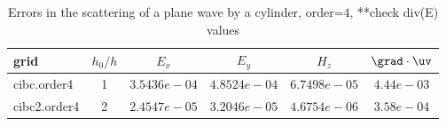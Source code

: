 \begin{table}[hbt]
\begin{center}
\begin{tabular}{|l|c|c|c|c|c|} \hline\hline 
grid  & $h_0/h$ &  $E_x$ &  $E_y$ & $H_z$ & $\grad\cdot\uv$\\ \hline 
cibc.order4  & 1 &  $3.5436e-04$  & $4.8524e-04$ & $6.7498e-05$ & $4.44e-03$   \\ \hline
cibc2.order4 & 2 &  $2.4547e-05$  & $3.2046e-05$ & $4.6754e-06$ & $3.58e-04$   \\ \hline
\end{tabular}
\caption{Errors in the scattering of a plane wave by a cylinder, order=$4$, **check div(E) values}\label{table:scatCyl}
\end{center}
\end{table}



